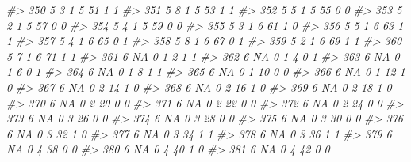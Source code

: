 \documentclass[]{book}
\newenvironment{Shaded}{\begin{snugshade}}{\end{snugshade}}
\newcommand{\CommentTok}[1]{\textcolor[rgb]{0.56,0.35,0.01}{\textit{#1}}}
\begin{document}
\begin{Shaded}
\begin{Highlighting}[]
\CommentTok{#> 350     5         3         1     5    51           1            1}
\CommentTok{#> 351     5         8         1     5    53           1            1}
\CommentTok{#> 352     5         5         1     5    55           0            0}
\CommentTok{#> 353     5         2         1     5    57           0            0}
\CommentTok{#> 354     5         4         1     5    59           0            0}
\CommentTok{#> 355     5         3         1     6    61           1            0}
\CommentTok{#> 356     5         5         1     6    63           1            1}
\CommentTok{#> 357     5         4         1     6    65           0            1}
\CommentTok{#> 358     5         8         1     6    67           0            1}
\CommentTok{#> 359     5         2         1     6    69           1            1}
\CommentTok{#> 360     5         7         1     6    71           1            1}
\CommentTok{#> 361     6        NA         0     1     2           1            1}
\CommentTok{#> 362     6        NA         0     1     4           0            1}
\CommentTok{#> 363     6        NA         0     1     6           0            1}
\CommentTok{#> 364     6        NA         0     1     8           1            1}
\CommentTok{#> 365     6        NA         0     1    10           0            0}
\CommentTok{#> 366     6        NA         0     1    12           1            0}
\CommentTok{#> 367     6        NA         0     2    14           1            0}
\CommentTok{#> 368     6        NA         0     2    16           1            0}
\CommentTok{#> 369     6        NA         0     2    18           1            0}
\CommentTok{#> 370     6        NA         0     2    20           0            0}
\CommentTok{#> 371     6        NA         0     2    22           0            0}
\CommentTok{#> 372     6        NA         0     2    24           0            0}
\CommentTok{#> 373     6        NA         0     3    26           0            0}
\CommentTok{#> 374     6        NA         0     3    28           0            0}
\CommentTok{#> 375     6        NA         0     3    30           0            0}
\CommentTok{#> 376     6        NA         0     3    32           1            0}
\CommentTok{#> 377     6        NA         0     3    34           1            1}
\CommentTok{#> 378     6        NA         0     3    36           1            1}
\CommentTok{#> 379     6        NA         0     4    38           0            0}
\CommentTok{#> 380     6        NA         0     4    40           1            0}
\CommentTok{#> 381     6        NA         0     4    42           0            0}

\end{Highlighting}
\end{Shaded}
\end{document}
